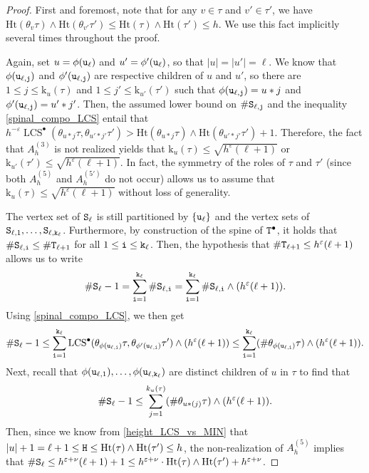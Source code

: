 \documentclass[11pt,reqno]{amsart}
\newcommand{\Ht}{\mathrm{Ht}}
\newcommand{\rk}{\mathrm{k}}
\newcommand{\LCS}{\operatorname{LCS}}
\newcommand{\eps}{\varepsilon}
\begin{document}
\begin{proof}
First and foremost, note that for any $v\in\tau$ and $v'\in\tau'$, we have $\Ht(\theta_v\tau)\wedge \Ht(\theta_{v'}\tau')\leq \Ht(\tau)\wedge\Ht(\tau')\leq h$. We use this fact implicitly several times throughout the proof.

Again, set $u=\phi(\mathtt{u}_\ell)$ and $u'=\phi'(\mathtt{u}_\ell)$, so that $|u|=|u'|=\ell$. We know that $\phi(\mathtt{u}_{\ell,\mathtt{j}})$ and $\phi'(\mathtt{u}_{\ell,\mathtt{j}})$ are respective children of $u$ and $u'$, so there are $1\leq j\leq \rk_u(\tau)$ and $1\leq j'\leq \rk_{u'}(\tau')$ such that $\phi(\mathtt{u}_{\ell,\mathtt{j}})=u*j$ and $\phi'(\mathtt{u}_{\ell,\mathtt{j}})=u'*j'$. Then, the assumed lower bound on $\#\mathtt{S}_{\ell,\mathtt{j}}$ and the inequality \eqref{spinal_compo_LCS} entail that $h^{-\varepsilon}\LCS^\bullet(\theta_{u*j}\tau,\theta_{u'*j'}\tau')>  \Ht(\theta_{u*j}\tau)\wedge \Ht(\theta_{u'*j'}\tau')+1$. Therefore, the fact that $A_h^{(3)}$ is not realized yields that $\rk_u(\tau)\leq \sqrt{h^\varepsilon(\ell+1)}$ or $\rk_{u'}(\tau')\leq \sqrt{h^\varepsilon(\ell+1)}$. In fact, the symmetry of the roles of $\tau$ and $\tau'$ (since both $A_h^{(5)}$ and $A_h^{(5')}$ do not occur) allows us to assume that $\rk_u(\tau)\leq\sqrt{h^\varepsilon(\ell+1)}$ without loss of generality.

The vertex set of $\mathtt{S}_\ell$ is still partitioned by $\{\mathtt{u}_\ell\}$ and the vertex sets of $\mathtt{S}_{\ell,1},\ldots,\mathtt{S}_{\ell,\mathtt{k}_\ell}$. Furthermore, by construction of the spine of $\mathtt{T}^\bullet$, it holds that $\#\mathtt{S}_{\ell,\mathtt{i}}\leq \#\mathtt{T}_{\ell+1}$ for all $1\leq\mathtt{i}\leq\mathtt{k}_\ell$. Then, the hypothesis that $\#\mathtt{T}_{\ell+1}\leq h^\varepsilon(\ell+1)$ allows us to write
\[\#\mathtt{S}_\ell-1= \sum_{\mathtt{i}=1}^{\mathtt{k}_\ell}\#\mathtt{S}_{\ell,\mathtt{i}}=\sum_{\mathtt{i}=1}^{\mathtt{k}_\ell}\#\mathtt{S}_{\ell,\mathtt{i}}\wedge (h^\varepsilon(\ell+1)).\]
Using \eqref{spinal_compo_LCS}, we then get
\[\#\ttS_\ell-1\leq \sum_{\tti=1}^{\ttk_\ell}\LCS^\bullet(\theta_{\phi(\ttu_{\ell,\tti})}\tau,\theta_{\phi'(\ttu_{\ell,\tti})}\tau')\wedge(h^\varepsilon(\ell+1)) \leq \sum_{\tti=1}^{\ttk_\ell}(\#\theta_{\phi(\ttu_{\ell,\tti})}\tau)\wedge( h^\varepsilon(\ell+1)).\]
Next, recall that $\phi(\mathtt{u}_{\ell,1}),\ldots,\phi(\mathtt{u}_{\ell,\mathtt{k}_\ell})$ are distinct children of $u$ in $\tau$ to find that
\[\#\mathtt{S}_\ell-1\leq \sum_{j=1}^{k_u(\tau)}(\#\theta_{u*(j)}\tau)\wedge( h^\varepsilon(\ell+1)).\]
Then, since we know from \eqref{height_LCS_vs_MIN} that $|u|+1=\ell+1\leq \ttH\leq \Ht(\tau)\wedge\Ht(\tau')\leq h$, the non-realization of $A_h^{(5)}$ implies that $\#\ttS_\ell\leq h^{\eps+\nu}(\ell+1)+1\leq h^{\eps+\nu}\cdot \Ht(\tau)\wedge\Ht(\tau')+h^{\varepsilon+\nu}$.
\end{proof}
\end{document}
